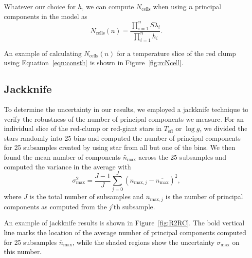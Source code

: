 \documentclass[a4paper,fleqn,usenatbib]{mnras}
\newcommand       \teff     {{T_{\mathrm{eff}}}}
\newcommand       \Rsq      {{R^2}}
\begin{document}
Whatever our choice for $h$, we can compute $N_{\mathrm{cells}}$ when using $n$ principal components in the model as
\begin{equation}
N_{\mathrm{cells}}(n) = \frac{\prod_{i=1}^n S \lambda_i}{\prod_{i=1}^n h_i}.
\label{eqn:Ncells}
\end{equation}

An example of calculating $N_{\mathrm{cells}}(n)$ for a temperature slice of the red clump using Equation~\eqref{eqn:consth} is shown in Figure~\ref{fig:rcNcell}. 


\subsection{Jackknife}
\label{sec:jackknife}

To determine the uncertainty in our results, we employed a jackknife technique to verify the robustness of the number of principal components we measure. For an individual slice of the red-clump or red-giant stars in $\teff$ or $\log g$, we divided the stars randomly into 25 bins and computed the number of principal components for 25 subsamples created by using star from all but one of the bins. We then found the mean number of components $\bar{n}_{\mathrm{max}}$ across the 25 subsamples and computed the variance in the average with
\begin{equation}
	\sigma^2_{\mathrm{max}} = \frac{J-1}{J}\sum_{j=0}^J \left(n_{\mathrm{max},j} -\overline{n_{\mathrm{max}}}\right)^2,
\end{equation}
where $J$ is the total number of subsamples and $n_{\mathrm{max},j}$ is the number of principal components as computed from the $j$'th subsample. 

An example of jackknife results is shown in Figure~\ref{fig:R2RC}. The bold vertical line marks the location of the average number of principal components computed for 25 subsamples $\bar{n}_{\mathrm{max}}$, while the shaded regions show the uncertainty $\sigma_{\mathrm{max}}$ on this number. 
\end{document}
